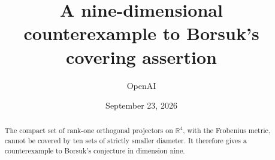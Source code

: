 \documentclass[11pt]{article}
\title{A nine-dimensional counterexample to Borsuk's covering assertion}
\author{OpenAI}
\date{September 23, 2026}
\begin{document}
\maketitle
\begin{abstract}
The compact set of rank-one orthogonal projectors on $\mathbb R^4$,
with the Frobenius metric, cannot be covered by ten sets of strictly
smaller diameter. It therefore gives a counterexample to Borsuk's
conjecture in dimension nine.
\end{abstract}
\setcounter{tocdepth}{1}
\tableofcontents
\clearpage









\end{document}

